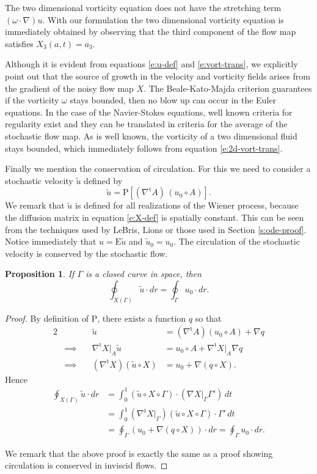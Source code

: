 \documentclass[final]{amsart}%
\newcommand{\transpose}{^\text{t}}
\newcommand{\grad}{\nabla}
\newcommand{\gradt}{\grad\transpose}
\newcommand{\urandom}{\tilde{u}}
\newcommand{\E}{\boldsymbol{\mathrm{E}}}
\newcommand{\lhp}{\boldsymbol{\mathrm{P}}}
\newcommand{\at}[1]{\big|_{#1}}
\numberwithin{equation}{section}
\newtheorem{prop}[theorem]{Proposition}
\theoremstyle{definition}
\theoremstyle{remark}
\begin{document}
The two dimensional vorticity equation does not have the stretching term $(\omega \cdot \grad) u$.  With our formulation the two dimensional vorticity equation is immediately obtained by observing that the third component of the flow map satisfies $X_3(a,t) = a_3$.

Although it is evident from equations \eqref{e:u-def} and \eqref{e:vort-trans}, we explicitly point out that the source of growth in the velocity and vorticity fields arises from the gradient of the noisy flow map $X$. The Beale-Kato-Majda \cite{bkm} criterion guarantees if the vorticity $\omega$ stays bounded, then no blow up can occur in the Euler equations.  In the case of the Navier-Stokes equations, well known criteria for regularity exist and they can be translated in criteria for the average of the stochastic flow map. As is well known, the vorticity of a two dimensional fluid stays bounded, which immediately follows from equation \eqref{e:2d-vort-trans}.

Finally we mention the conservation of circulation. For this we need to consider a stochastic velocity $\urandom$ defined by
\begin{equation}
\label{e:urandom-def}\urandom = \lhp \left[(\gradt A) \, (u_0 \circ A) \right].
\end{equation}
We remark that $\urandom$ is defined for all realizations of the Wiener process, because the diffusion matrix in equation \eqref{e:X-def} is spatially constant. This can be seen from the techniques used by LeBris, Lions \cite{lebris} or those used in Section \ref{s:ode-proof}. Notice immediately that $u = \E \urandom$ and $\urandom_0 = u_0$. The circulation of the stochastic velocity is conserved by the stochastic flow.

\begin{prop}%
If $\Gamma$ is a closed curve in space, then
$$ \oint_{X(\Gamma)} \urandom \cdot dr = \oint_\Gamma u_0 \cdot dr.$$
\end{prop}
\begin{proof}%
By definition of $\lhp$, there exists a function $q$ so that
\begin{alignat*}{2}
&&	\urandom &= (\gradt A) (u_0\circ A) + \grad q\\
&\implies\quad&	\gradt X\at{A} \urandom &= u_0 \circ A + \gradt X\at{A} \grad q\\
&\implies& (\gradt X) (\urandom \circ X) &= u_0 + \grad(q \circ X).
\end{alignat*}
Hence
\begin{align*}
\oint_{X(\Gamma)} \urandom \cdot dr &= \int_0^1 (\urandom\circ X \circ \Gamma) \cdot (\grad X\at{\Gamma} \Gamma') \,dt\\
    &= \int_0^1 (\gradt X\at{\Gamma}) (\urandom \circ X \circ \Gamma) \cdot \Gamma' \,dt\\
    &= \oint_\Gamma (u_0 + \grad( q \circ X) ) \cdot dr = \oint_\Gamma u_0 \cdot dr.
\end{align*}

We remark that the above proof is exactly the same as a proof showing circulation is conserved in inviscid flows.
\end{proof}%
\end{document}
